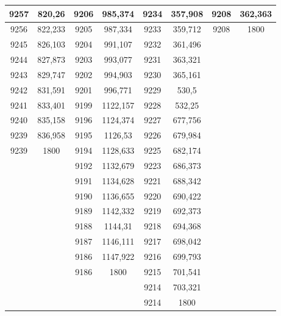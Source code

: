 \documentclass[11pt]{article}
\begin{document}
{{\begin{tabular}{|c|c|c|c|c|c|c|c|}
            \hline 
            9257 & 820,26 & 9206 & 985,374 & 9234 & 357,908 & 9208 & 362,363\tabularnewline
            \hline 
            9256 & 822,233 & 9205 & 987,334 & 9233 & 359,712 & 9208 & 1800\tabularnewline
            \hline 
            9245 & 826,103 & 9204 & 991,107 & 9232 & 361,496 & \multicolumn{1}{c}{} & \multicolumn{1}{c}{}\tabularnewline
            \cline{1-6} 
            9244 & 827,873 & 9203 & 993,077 & 9231 & 363,321 & \multicolumn{1}{c}{} & \multicolumn{1}{c}{}\tabularnewline
            \cline{1-6} 
            9243 & 829,747 & 9202 & 994,903 & 9230 & 365,161 & \multicolumn{1}{c}{} & \multicolumn{1}{c}{}\tabularnewline
            \cline{1-6} 
            9242 & 831,591 & 9201 & 996,771 & 9229 & 530,5 & \multicolumn{1}{c}{} & \multicolumn{1}{c}{}\tabularnewline
            \cline{1-6} 
            9241 & 833,401 & 9199 & 1122,157 & 9228 & 532,25 & \multicolumn{1}{c}{} & \multicolumn{1}{c}{}\tabularnewline
            \cline{1-6} 
            9240 & 835,158 & 9196 & 1124,374 & 9227 & 677,756 & \multicolumn{1}{c}{} & \multicolumn{1}{c}{}\tabularnewline
            \cline{1-6} 
            9239 & 836,958 & 9195 & 1126,53 & 9226 & 679,984 & \multicolumn{1}{c}{} & \multicolumn{1}{c}{}\tabularnewline
            \cline{1-6} 
            9239 & 1800 & 9194 & 1128,633 & 9225 & 682,174 & \multicolumn{1}{c}{} & \multicolumn{1}{c}{}\tabularnewline
            \cline{1-6} 
            \multicolumn{1}{c}{} &  & 9192 & 1132,679 & 9223 & 686,373 & \multicolumn{1}{c}{} & \multicolumn{1}{c}{}\tabularnewline
            \cline{3-6} 
            \multicolumn{1}{c}{} &  & 9191 & 1134,628 & 9221 & 688,342 & \multicolumn{1}{c}{} & \multicolumn{1}{c}{}\tabularnewline
            \cline{3-6} 
            \multicolumn{1}{c}{} &  & 9190 & 1136,655 & 9220 & 690,422 & \multicolumn{1}{c}{} & \multicolumn{1}{c}{}\tabularnewline
            \cline{3-6} 
            \multicolumn{1}{c}{} &  & 9189 & 1142,332 & 9219 & 692,373 & \multicolumn{1}{c}{} & \multicolumn{1}{c}{}\tabularnewline
            \cline{3-6} 
            \multicolumn{1}{c}{} &  & 9188 & 1144,31 & 9218 & 694,368 & \multicolumn{1}{c}{} & \multicolumn{1}{c}{}\tabularnewline
            \cline{3-6} 
            \multicolumn{1}{c}{} &  & 9187 & 1146,111 & 9217 & 698,042 & \multicolumn{1}{c}{} & \multicolumn{1}{c}{}\tabularnewline
            \cline{3-6} 
            \multicolumn{1}{c}{} &  & 9186 & 1147,922 & 9216 & 699,793 & \multicolumn{1}{c}{} & \multicolumn{1}{c}{}\tabularnewline
            \cline{3-6} 
            \multicolumn{1}{c}{} &  & 9186 & 1800 & 9215 & 701,541 & \multicolumn{1}{c}{} & \multicolumn{1}{c}{}\tabularnewline
            \cline{3-6} 
            \multicolumn{1}{c}{} & \multicolumn{1}{c}{} & \multicolumn{1}{c}{} &  & 9214 & 703,321 & \multicolumn{1}{c}{} & \multicolumn{1}{c}{}\tabularnewline
            \cline{5-6} 
            \multicolumn{1}{c}{} & \multicolumn{1}{c}{} & \multicolumn{1}{c}{} &  & 9214 & 1800 & \multicolumn{1}{c}{} & \multicolumn{1}{c}{}\tabularnewline
            \cline{5-6} 
        \end{tabular}
    }
}
\vspace*{\fill}
\end{document}
